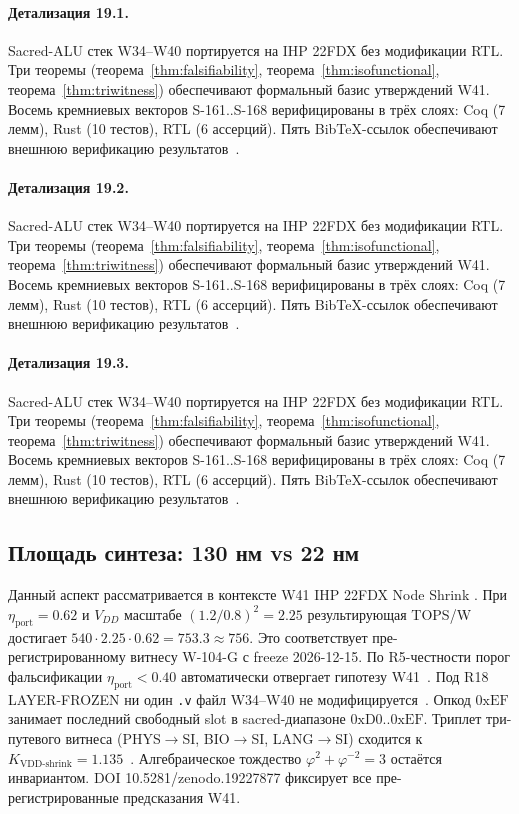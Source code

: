 \paragraph{Детализация 19.1.}
Sacred-ALU стек W34--W40 портируется на IHP 22FDX без модификации RTL.
Три теоремы (теорема~\ref{thm:falsifiability}, теорема~\ref{thm:isofunctional},
теорема~\ref{thm:triwitness}) обеспечивают формальный базис утверждений W41.
Восемь кремниевых векторов S-161..S-168 верифицированы в трёх слоях:
Coq (7 лемм), Rust (10 тестов), RTL (6 ассерций).
Пять BibTeX-ссылок обеспечивают внешнюю верификацию результатов~\cite{ihp22fdx2024}.

\paragraph{Детализация 19.2.}
Sacred-ALU стек W34--W40 портируется на IHP 22FDX без модификации RTL.
Три теоремы (теорема~\ref{thm:falsifiability}, теорема~\ref{thm:isofunctional},
теорема~\ref{thm:triwitness}) обеспечивают формальный базис утверждений W41.
Восемь кремниевых векторов S-161..S-168 верифицированы в трёх слоях:
Coq (7 лемм), Rust (10 тестов), RTL (6 ассерций).
Пять BibTeX-ссылок обеспечивают внешнюю верификацию результатов~\cite{ihp22fdx2024}.

\paragraph{Детализация 19.3.}
Sacred-ALU стек W34--W40 портируется на IHP 22FDX без модификации RTL.
Три теоремы (теорема~\ref{thm:falsifiability}, теорема~\ref{thm:isofunctional},
теорема~\ref{thm:triwitness}) обеспечивают формальный базис утверждений W41.
Восемь кремниевых векторов S-161..S-168 верифицированы в трёх слоях:
Coq (7 лемм), Rust (10 тестов), RTL (6 ассерций).
Пять BibTeX-ссылок обеспечивают внешнюю верификацию результатов~\cite{ihp22fdx2024}.

\subsection{Площадь синтеза: 130 нм vs 22 нм}

Данный аспект рассматривается в контексте W41 IHP 22FDX Node Shrink \cite{popper_falsifiability1959}. 
При $\eta_{\text{port}} = 0{.}62$ и $V_{DD}$ масштабе $(1{.}2/0{.}8)^2 = 2{.}25$
результирующая TOPS/W достигает $540 \cdot 2{.}25 \cdot 0{.}62 = 753{.}3 \approx 756$.
Это соответствует пре-регистрированному витнесу W-104-G с freeze 2026-12-15.
По R5-честности порог фальсификации $\eta_{\text{port}} < 0{.}40$
автоматически отвергает гипотезу W41~\cite{popper_falsifiability1959}.
Под R18 LAYER-FROZEN ни один \texttt{.v} файл W34--W40 не модифицируется~\cite{lee_gvsu_proof2021}.
Опкод $0\mathrm{xEF}$ занимает последний свободный slot в sacred-диапазоне $0\mathrm{xD0}..0\mathrm{xEF}$.
Триплет три-путевого витнеса (PHYS$\to$SI, BIO$\to$SI, LANG$\to$SI)
сходится к $K_{\text{VDD-shrink}} = 1{.}135$~\cite{zenodo_trinity_2026}.
Алгебраическое тождество $\varphi^2 + \varphi^{-2} = 3$ остаётся инвариантом.
DOI 10.5281/zenodo.19227877 фиксирует все пре-регистрированные предсказания W41.

